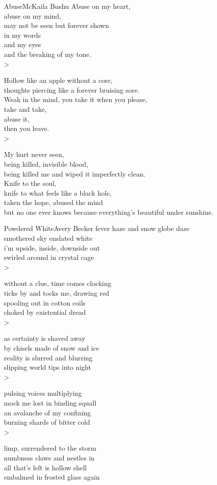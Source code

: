 
\begin{poetry}{Abuse}{McKaila Bushu}
Abuse on my heart,\\
abuse on my mind,\\
may not be seen but forever shown\\
in my words\\
and my eyes\\
and the breaking of my tone.\\>

Hollow like an apple without a core,\\
thoughts piercing like a forever bruising sore.\\
Weak in the mind, you take it when you please,\\
take and take,\\
abuse it,\\
then you leave.\\>

My hurt never seen,\\
being killed, invisible blood,\\
being killed me and wiped it imperfectly clean.\\
Knife to the soul,\\
knife to what feels like a black hole,\\
taken the hope, abused the mind\\
but no one ever knows because everything's beautiful under sunshine.
\end{poetry}

\begin{poetry}{Powdered White}{Avery Becker}
fever haze and snow globe daze\\
smothered sky enslated white\\
i'm upside, inside, downside out\\
swirled around in crystal cage\\>

without a clue, time comes clocking\\
ticks by and tocks me, drawing red\\
spooling out in cotton coils\\
choked by existential dread\\>

as certainty is shaved away\\
by chisels made of snow and ice\\
reality is slurred and blurring\\
slipping world tips into night\\>

pulsing voices multiplying\\
mock me lost in binding squall\\
an avalanche of my confining\\
burning shards of bitter cold\\>

limp, surrendered to the storm\\
numbness claws and nestles in\\
all that's left is hollow shell\\
embalmed in frosted glass again
\end{poetry}

